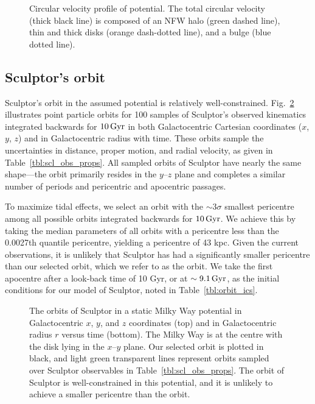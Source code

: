 \begin{figure}
\centering
{}
\caption[Circular velocity of the Milky Way potential]{Circular velocity
profile of \citet{EP2020} potential. The total circular velocity (thick
black line) is composed of an NFW halo (green dashed line), thin and
thick \citet{miyamoto+nagai1975} disks (orange dash-dotted line), and a
\citet{hernquist1990} bulge (blue dotted
line).}\label{fig:v_circ_potential}
\end{figure}

\subsection{Sculptor's orbit}\label{sec:scl_smallperi}

Sculptor's orbit in the assumed potential is relatively
well-constrained. Fig.~\ref{fig:scl_orbits} illustrates point particle
orbits for 100 samples of Sculptor's observed kinematics integrated
backwards for \(10\,{\rm Gyr}\) in both Galactocentric Cartesian coordinates
(\(x\), \(y\), \(z\)) and in Galactocentric radius with time. These
orbits sample the uncertainties in distance, proper motion, and radial
velocity, as given in Table~\ref{tbl:scl_obs_props}. All sampled orbits
of Sculptor have nearly the same shape---the orbit primarily resides in
the \(y\)--\(z\) plane and completes a similar number of periods and
pericentric and apocentric passages.

To maximize tidal effects, we select an orbit with the \(\sim 3\sigma\)
smallest pericentre among all possible orbits integrated backwards for
\(10\,{\rm Gyr}\). We achieve this by taking the median parameters of all
orbits with a pericentre less than the 0.0027th quantile pericentre,
yielding a pericentre of 43 kpc. Given the current observations, it is
unlikely that Sculptor has had a significantly smaller pericentre than
our selected orbit, which we refer to as the \smallperi{} orbit. We take
the first apocentre after a look-back time of 10 Gyr, or at
\(\sim9.1\,{\rm Gyr}\), as the initial conditions for our model of Sculptor,
noted in Table~\ref{tbl:orbit_ics}.

\begin{figure}
\centering
{}
\caption[Sculptor's possible orbits]{The orbits of Sculptor in a static
Milky Way potential in Galactocentric \(x\), \(y\), and \(z\)
coordinates (top) and in Galactocentric radius \(r\) versus time
(bottom). The Milky Way is at the centre with the disk lying in the
\(x\)--\(y\) plane. Our selected \smallperi{} orbit is plotted in black,
and light green transparent lines represent orbits sampled over Sculptor
observables in Table~\ref{tbl:scl_obs_props}. The orbit of Sculptor is
well-constrained in this potential, and it is unlikely to achieve a
smaller pericentre than the \smallperi{} orbit.}\label{fig:scl_orbits}
\end{figure}

